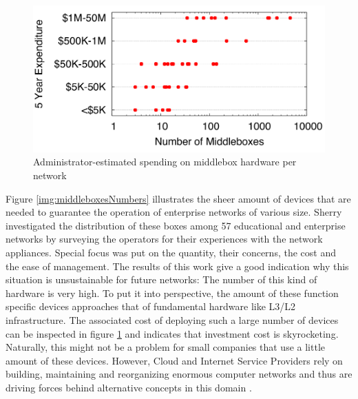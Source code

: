 \begin{figure}[h]
	\centering
	\includegraphics[width=1\linewidth]{images/middleboxesCost.png}
	\caption{Administrator-estimated spending on middlebox hardware per network \cite{sherry2016middleboxes}}
	\label{img:middleboxesCost}
\end{figure}

Figure \ref{img:middleboxesNumbers} illustrates the sheer amount of devices that are needed to guarantee the operation of enterprise networks of various size. Sherry \cite{sherry2016middleboxes} \cite{sherry2012survey}  investigated the distribution of these boxes among 57 educational and enterprise networks by surveying the operators for their experiences with the network appliances. Special focus was put on the quantity, their concerns, the cost and the ease of management. The results of this work give a good indication why this situation is unsustainable for future networks:  The number of this kind of hardware is very high. To put it into perspective, the amount of these function specific devices approaches that of fundamental hardware like L3/L2 infrastructure. The associated cost of deploying such a large number of devices can be inspected in figure \ref{img:middleboxesCost} and indicates that investment cost is skyrocketing. Naturally, this might not be a problem for small companies that use a little amount of these devices. However, Cloud and Internet Service Providers rely on building, maintaining and reorganizing enormous computer networks and thus are driving forces behind alternative concepts in this domain \cite{sherry2016middleboxes} \cite{sherry2012survey}.

